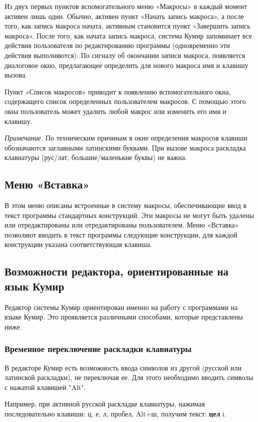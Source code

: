 Из двух первых пунктов вспомогательного меню «Макросы» в каждый момент активен лишь один. Обычно, активен пункт «Начать запись макроса», а после того, как запись макроса начата, активным становится пункт «Завершить запись макроса». После того, как начата запись макроса, система Кумир запоминает все действия пользователя по редактированию программы (одновременно эти действия выполняются).  По сигналу об окончании записи макроса, появляется диалоговое окно, предлагающее определить для нового макроса имя и клавишу вызова. 

Пункт «Список макросов» приводит к появлению вспомогательного окна, содержащего список определенных пользователем макросов. С помощью этого окна пользователь может удалить любой макрос или изменить его имя и клавишу.

\emph{Примечание.} По техническим причинам в окне определения макросов клавиши обозначаются заглавными латинскими буквами. При вызове макроса раскладка клавиатуры (рус/лат, большие/маленькие буквы) не важна.

\subsection{Меню «Вставка»}

В этом меню описаны встроенные в систему макросы, обеспечивающие ввод в текст программы стандартных конструкций. Эти макросы не могут быть удалены или отредактированы или отредактированы пользователем. Меню «Вставка» позволяют вводить в текст программы следующие конструкции, для каждой конструкции указана соответствующая клавиша.

\subsection{Возможности редактора, ориентированные на язык Кумир}

Редактор системы Кумир ориентирован именно на работу с программами на языке Кумир. Это проявляется различными способами, которые представлены ниже.

\subsubsection{Временное переключение раскладки клавиатуры}
В редакторе Кумир есть возможность ввода символов из другой (русской или латинской раскладки), не переключая ее.
Для этого необходимо вводить символы с нажатой клавишей "Alt".

Например, при активной русской раскладке клавиатуры, нажимая последовательно клавиши: \textsf{ц}, \textsf{е}, \textsf{л},
 \textsf{пробел}, \textsf{Alt+ш}, получим текст: \textbf{\textsf{цел}} \textsf{i}.
 
